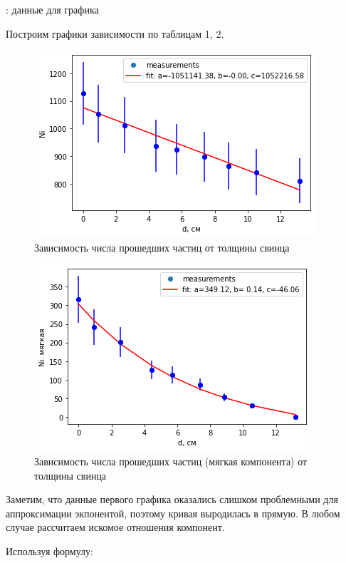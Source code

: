 \documentclass[15pt,a5paper,reqno]{article}
\begin{document}
\begin{table}[h!]
    \centering
    
    \caption{: данные для графика}
    \label{tb2}
\end{table}


Построим графики зависимости по таблицам 1, 2.

\begin{figure}[h!]
    \centering
    \includegraphics[width=0.8\linewidth]{pics/N_i(d).png}
    \caption{Зависимость числа прошедших частиц от толщины свинца}
    \label{graph}
\end{figure}

\begin{figure}[h!]
    \centering
    \includegraphics[width=0.8\linewidth]{pics/N_i_light(d).png}
    \caption{Зависимость числа прошедших частиц (мягкая компонента) от толщины свинца}
    \label{graph}
\end{figure}

Заметим, что данные первого графика оказались слишком проблемными для аппроксимации экпонентой, поэтому кривая выродилась в прямую.
В любом случае рассчитаем искомое отношения компонент.

Используя формулу:
\end{document}

